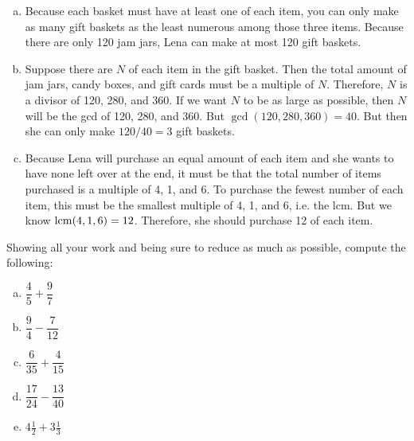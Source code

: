 \documentclass[11pt,letterpaper]{article}
\begin{document}
\sol
\begin{enumerate}[(a)]
\item Because each basket must have at least one of each item, you can only make as many gift baskets as the least numerous among those three items. Because there are only 120 jam jars, Lena can make at most 120 gift baskets. \pspace

\item Suppose there are $N$ of each item in the gift basket. Then the total amount of jam jars, candy boxes, and gift cards must be a multiple of $N$. Therefore, $N$ is a divisor of 120, 280, and 360. If we want $N$ to be as large as possible, then $N$ will be the gcd of 120, 280, and 360. But $\gcd(120, 280, 360)= 40$. But then she can only make $120/40= 3$ gift baskets. \pspace

\item Because Lena will purchase an equal amount of each item and she wants to have none left over at the end, it must be that the total number of items purchased is a multiple of 4, 1, and 6. To purchase the fewest number of each item, this must be the smallest multiple of 4, 1, and 6, i.e. the lcm. But we know $\operatorname{lcm}(4, 1, 6)= 12$. Therefore, she should purchase 12 of each item. 
\end{enumerate}



\newpage



 Showing all your work and being sure to reduce as much as possible, compute the following:
\begin{enumerate}[(a)]
\item $\dfrac{4}{5} + \dfrac{9}{7}$
\item $\dfrac{9}{4} - \dfrac{7}{12}$
\item $\dfrac{6}{35} + \dfrac{4}{15}$
\item $\dfrac{17}{24} - \dfrac{13}{40}$
\item $4\frac{1}{2} + 3\frac{1}{3}$
\end{enumerate} \pspace
\end{document}
